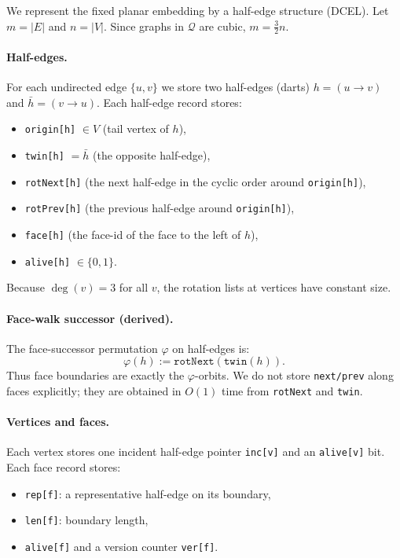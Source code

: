 \documentclass[12pt]{article}
\theoremstyle{definition}
\begin{document}
We represent the fixed planar embedding by a half-edge structure (DCEL).
Let $m=|E|$ and $n=|V|$.  Since graphs in $\mathcal Q$ are cubic, $m=\tfrac{3}{2}n$.

\paragraph{Half-edges.}
For each undirected edge $\{u,v\}$ we store two half-edges (darts) $h=(u\to v)$ and $\bar h=(v\to u)$.
Each half-edge record stores:
\begin{itemize}
    \item \texttt{origin[h]} $\in V$ (tail vertex of $h$),
    \item \texttt{twin[h]} $=\bar h$ (the opposite half-edge),
    \item \texttt{rotNext[h]} (the next half-edge in the cyclic order around \texttt{origin[h]}),
    \item \texttt{rotPrev[h]} (the previous half-edge around \texttt{origin[h]}),
    \item \texttt{face[h]} (the face-id of the face to the left of $h$),
    \item \texttt{alive[h]} $\in \{0,1\}$.
\end{itemize}
Because $\deg(v)=3$ for all $v$, the rotation lists at vertices have constant size.

\paragraph{Face-walk successor (derived).}
The face-successor permutation $\varphi$ on half-edges is:
\[
\varphi(h) := \texttt{rotNext}(\texttt{twin}(h)).
\]
Thus face boundaries are exactly the $\varphi$-orbits.  We do not store \texttt{next/prev} along faces explicitly;
they are obtained in $O(1)$ time from \texttt{rotNext} and \texttt{twin}.

\paragraph{Vertices and faces.}
Each vertex stores one incident half-edge pointer \texttt{inc[v]} and an \texttt{alive[v]} bit.
Each face record stores:
\begin{itemize}
    \item \texttt{rep[f]}: a representative half-edge on its boundary,
    \item \texttt{len[f]}: boundary length,
    \item \texttt{alive[f]} and a version counter \texttt{ver[f]}.
\end{itemize}
\end{document}
